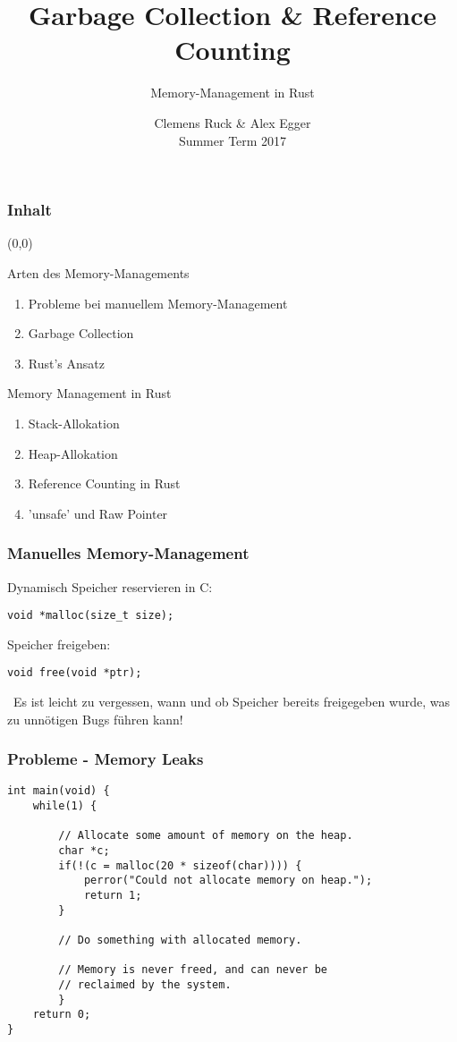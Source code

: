 \documentclass{beamer}
\title{Garbage Collection \& Reference Counting}
\author{Memory-Management in Rust}
\institute[TUM]{
	\vspace{-15em}\tumheader\vspace{18em}
}
\date{Clemens Ruck \& Alex Egger \\ Summer Term 2017}
\newcommand{\attention}{{\scalebox{.75}{\bf}}\ }
\begin{document}
\maketitle
\begin{frame}
	\frametitle{Inhalt}
	\begin{textblock}{6}(0,0)
		\begin{alertblock}{Arten des Memory-Managements}
			\begin{enumerate}
				\item Probleme bei manuellem Memory-Management
				\item Garbage Collection
				\item Rust's Ansatz
			\end{enumerate}
		\end{alertblock}
		\begin{alertblock}{Memory Management in Rust}
			\begin{enumerate}
				\item Stack-Allokation
				\item Heap-Allokation
				\item Reference Counting in Rust
				\item 'unsafe' und Raw Pointer
			\end{enumerate}
		\end{alertblock}
	\end{textblock}
\end{frame}
\begin{frame}[fragile]
	\frametitle{Manuelles Memory-Management}
	Dynamisch Speicher reservieren in C:
	\begin{verbatim}
void *malloc(size_t size);
	\end{verbatim}
	Speicher freigeben:
	\begin{verbatim}
void free(void *ptr);
	\end{verbatim}
	\vspace{1cm}
	\attention Es ist leicht zu vergessen, wann und ob Speicher bereits freigegeben wurde, was zu unnötigen Bugs führen kann!
\end{frame}
\begin{frame}[fragile]
	\frametitle{Probleme - Memory Leaks}
	\begin{verbatim}
int main(void) {
	while(1) {

		// Allocate some amount of memory on the heap.
		char *c;
		if(!(c = malloc(20 * sizeof(char)))) {
			perror("Could not allocate memory on heap.");
			return 1;
		}

		// Do something with allocated memory.

		// Memory is never freed, and can never be
		// reclaimed by the system.
		}
	return 0;
}
	\end{verbatim}
\end{frame}
\end{document}
